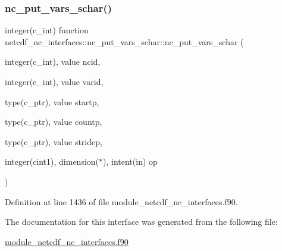 \subsubsection{\texorpdfstring{nc\+\_\+put\+\_\+vars\+\_\+schar()}{nc\_put\_vars\_schar()}}
{\footnotesize\ttfamily integer(c\+\_\+int) function netcdf\+\_\+nc\+\_\+interfaces\+::nc\+\_\+put\+\_\+vars\+\_\+schar\+::nc\+\_\+put\+\_\+vars\+\_\+schar (\begin{DoxyParamCaption}\item[{integer(c\+\_\+int), value}]{ncid,  }\item[{integer(c\+\_\+int), value}]{varid,  }\item[{type(c\+\_\+ptr), value}]{startp,  }\item[{type(c\+\_\+ptr), value}]{countp,  }\item[{type(c\+\_\+ptr), value}]{stridep,  }\item[{integer(cint1), dimension($\ast$), intent(in)}]{op }\end{DoxyParamCaption})}



Definition at line 1436 of file module\+\_\+netcdf\+\_\+nc\+\_\+interfaces.\+f90.



The documentation for this interface was generated from the following file\+:\begin{DoxyCompactItemize}
\item 
\hyperlink{module__netcdf__nc__interfaces_8f90}{module\+\_\+netcdf\+\_\+nc\+\_\+interfaces.\+f90}\end{DoxyCompactItemize}
